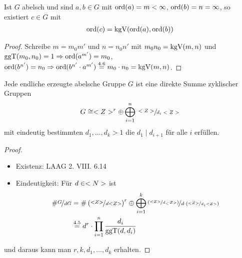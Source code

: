 \begin{conclusion}
	Ist $G$ abelsch und sind $a,b \in G$ mit $\operatorname{ord}(a) = m < \infty$, $\operatorname{ord}(b) = n = \infty$, so existiert $c \in G$ mit
	\begin{align}
		\operatorname{ord}(c) = \operatorname{kgV}(\operatorname{ord}(a), \operatorname{ord}(b)) \notag
	\end{align}
\end{conclusion}
\begin{proof}
	Schreibe $m = m_0 m'$ und $n = n_0 n'$ mit $m_0 n_0 = \operatorname{kgV}(m,n)$ und $\operatorname{ggT}(m_0, n_0) = 1 \Rightarrow \operatorname{ord}(a^{m'}) = m_0$, $\operatorname{ord}(b^{n'}) = n_0 \Rightarrow \operatorname{ord}(b^{n'} \cdot a^{m'}) \overset{4.6}{=} m_0 \cdot n_0 = \operatorname{kgV}(m,n)$.
\end{proof}

\begin{theorem}
	Jede endliche erzeugte abelsche Gruppe $G$ ist eine direkte Summe zyklischer Gruppen
	\begin{align}
		G \cong <Z>^{r} \oplus\bigoplus_{i=1}^n \sfrac{<Z>}{d_i <Z>} \notag
	\end{align}
	mit eindeutig bestimmten $d_1, \dots, d_k > 1$ die $d_1 \mid d_{i+1}$ für alle $i$ erfüllen.
\end{theorem}
\begin{proof}
	\begin{itemize}
		\item Existenz: LAAG 2. VIII. 6.14
		\item Eindeutigkeit: Für $d \in <N>$ ist 
		\begin{align}
			\# \lnkset{G}{dG} &= \#\left( \lnkset{\whole}{d \whole}\right)^r \oplus \bigoplus_{i=1}^k \lnkset{\left(\lnkset{\whole}{d_\whole}\right)}{d\cdot\left(\lnkset{\whole}{d_i\whole}\right)} \notag \\
			&\overset{4.5}{=} d^r \cdot \prod_{i=1}^{n} \frac{d_i}{\ggT(d,d_i)}\notag
		\end{align} 
	\end{itemize}
und daraus kann man $r, k, d_1, \dots , d_k$ erhalten.
\end{proof}

